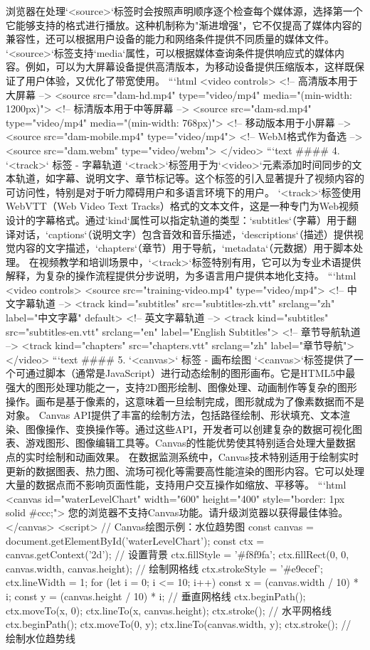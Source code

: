 {{浏览器在处理`<source>`标签时会按照声明顺序逐个检查每个媒体源，选择第一个它能够支持的格式进行播放。这种机制称为"渐进增强"，它不仅提高了媒体内容的兼容性，还可以根据用户设备的能力和网络条件提供不同质量的媒体文件。 `<source>`标签支持`media`属性，可以根据媒体查询条件提供响应式的媒体内容。例如，可以为大屏幕设备提供高清版本，为移动设备提供压缩版本，这样既保证了用户体验，又优化了带宽使用。 ```html <video controls> <!-- 高清版本用于大屏幕 --> <source src="dam-hd.mp4" type="video/mp4" media="(min-width: 1200px)"> <!-- 标清版本用于中等屏幕 --> <source src="dam-sd.mp4" type="video/mp4" media="(min-width: 768px)"> <!-- 移动版本用于小屏幕 --> <source src="dam-mobile.mp4" type="video/mp4"> <!-- WebM格式作为备选 --> <source src="dam.webm" type="video/webm"> </video> ```text #### 4. `<track>` 标签 - 字幕轨道 `<track>`标签用于为`<video>`元素添加时间同步的文本轨道，如字幕、说明文字、章节标记等。这个标签的引入显著提升了视频内容的可访问性，特别是对于听力障碍用户和多语言环境下的用户。 `<track>`标签使用WebVTT（Web Video Text Tracks）格式的文本文件，这是一种专门为Web视频设计的字幕格式。通过`kind`属性可以指定轨道的类型：`subtitles`（字幕）用于翻译对话，`captions`（说明文字）包含音效和音乐描述，`descriptions`（描述）提供视觉内容的文字描述，`chapters`（章节）用于导航，`metadata`（元数据）用于脚本处理。 在视频教学和培训场景中，`<track>`标签特别有用，它可以为专业术语提供解释，为复杂的操作流程提供分步说明，为多语言用户提供本地化支持。 ```html <video controls> <source src="training-video.mp4" type="video/mp4"> <!-- 中文字幕轨道 --> <track kind="subtitles" src="subtitles-zh.vtt" srclang="zh" label="中文字幕" default> <!-- 英文字幕轨道 --> <track kind="subtitles" src="subtitles-en.vtt" srclang="en" label="English Subtitles"> <!-- 章节导航轨道 --> <track kind="chapters" src="chapters.vtt" srclang="zh" label="章节导航"> </video> ```text #### 5. `<canvas>` 标签 - 画布绘图 `<canvas>`标签提供了一个可通过脚本（通常是JavaScript）进行动态绘制的图形画布。它是HTML5中最强大的图形处理功能之一，支持2D图形绘制、图像处理、动画制作等复杂的图形操作。画布是基于像素的，这意味着一旦绘制完成，图形就成为了像素数据而不是对象。 Canvas API提供了丰富的绘制方法，包括路径绘制、形状填充、文本渲染、图像操作、变换操作等。通过这些API，开发者可以创建复杂的数据可视化图表、游戏图形、图像编辑工具等。Canvas的性能优势使其特别适合处理大量数据点的实时绘制和动画效果。 在数据监测系统中，Canvas技术特别适用于绘制实时更新的数据图表、热力图、流场可视化等需要高性能渲染的图形内容。它可以处理大量的数据点而不影响页面性能，支持用户交互操作如缩放、平移等。 ```html <canvas id="waterLevelChart" width="600" height="400" style="border: 1px solid #ccc;"> 您的浏览器不支持Canvas功能。请升级浏览器以获得最佳体验。 </canvas> <script> // Canvas绘图示例：水位趋势图 const canvas = document.getElementById('waterLevelChart'); const ctx = canvas.getContext('2d'); // 设置背景 ctx.fillStyle = '#f8f9fa'; ctx.fillRect(0, 0, canvas.width, canvas.height); // 绘制网格线 ctx.strokeStyle = '#e9ecef'; ctx.lineWidth = 1; for (let i = 0; i <= 10; i++) { const x = (canvas.width / 10) * i; const y = (canvas.height / 10) * i; // 垂直网格线 ctx.beginPath(); ctx.moveTo(x, 0); ctx.lineTo(x, canvas.height); ctx.stroke(); // 水平网格线 ctx.beginPath(); ctx.moveTo(0, y); ctx.lineTo(canvas.width, y); ctx.stroke(); } // 绘制水位趋势线 }}

